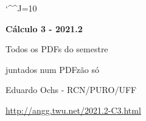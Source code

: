 \documentclass[oneside,12pt]{article}
\begin{document}

\def\u#1{\par{\footnotesize \url{#1}}}

\def\drafturl{http://angg.twu.net/LATEX/2021-2-C3.pdf}
\def\drafturl{http://angg.twu.net/2021.2-C3.html}
\def\draftfooter{\tiny \href{\drafturl}{\jobname{}} \ColorBrown{\shorttoday{} \hours}}

\catcode`\^^J=10
\pu



%

\thispagestyle{empty}

\begin{center}

\vspace*{1.2cm}

{\bf \Large Cálculo 3 - 2021.2}

\bsk

Todos os PDFs do semestre

juntados num PDFzão só

\bsk

Eduardo Ochs - RCN/PURO/UFF

\url{http://angg.twu.net/2021.2-C3.html}

\end{center}

\newpage



\end{document}
